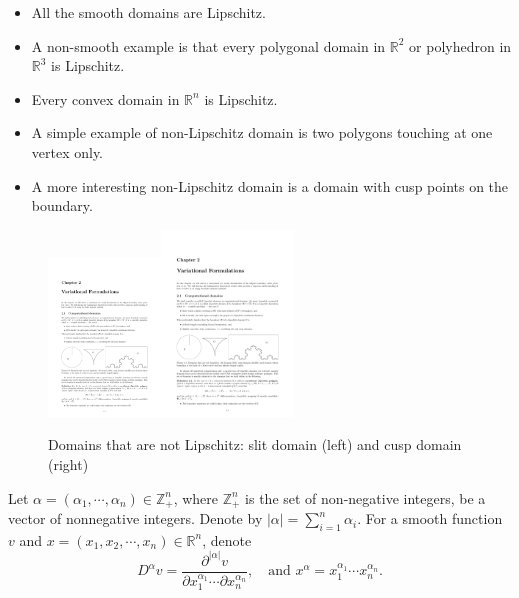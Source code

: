 \begin{exm}
\begin{itemize}
\item All the smooth domains are Lipschitz.
\item A non-smooth example is that every polygonal domain in $\mathbb R^2$ or polyhedron in $\mathbb R^3$ is Lipschitz.
\item Every convex domain in $\mathbb R^n$ is Lipschitz.
\item A simple example of non-Lipschitz domain is two polygons touching at one vertex only.
\item A more interesting non-Lipschitz domain is a domain with cusp points on the boundary.
\end{itemize}
\end{exm}
\begin{figure}[htbp]
  \centering
  \includegraphics[width=3cm]{figures/slitdomain}\quad\includegraphics[width=3.5cm]{figures/cuspdomain}\\
  \caption{Domains that are not Lipschitz: slit domain (left) and cusp domain (right)}\label{nonLipschitzDmain}
\end{figure}


Let $\alpha=(\alpha_1, \cdots, \alpha_n)\in\mathbb Z_+^n$, where $\mathbb Z_+^n$ is the set of non-negative integers, be a vector
of nonnegative integers. Denote by $|\alpha|=\sum_{i=1}^n\alpha_i$. For a smooth function $v$ and $x =(x_1,  x_2, \cdots, x_n)\in\mathbb R^n$, denote
\[
D^{\alpha}v=\frac{\partial^{|\alpha|}v}{\partial x_1^{\alpha_1}\cdots\partial x_n^{\alpha_n}},\quad \textrm{and } x^{\alpha}=x_1^{\alpha_1}\cdots x_n^{\alpha_n}.
\]

